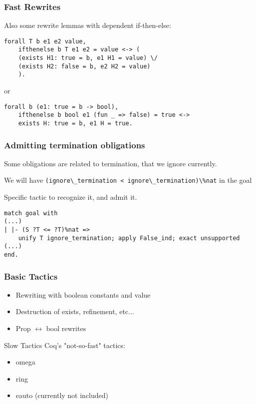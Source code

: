 \documentclass{beamer}
\newcommand{\coqInline}[1]{\lstinline[style=myCoqStyle]|#1|}
\begin{document}
\begin{frame}[fragile]
	\frametitle{Fast Rewrites}
	
	
	Also some rewrite lemmas with dependent if-then-else:
\begin{lstlisting}[style=myCoqstyle]
 forall T b e1 e2 value,
	ifthenelse b T e1 e2 = value <-> (
	(exists H1: true = b, e1 H1 = value) \/
	(exists H2: false = b, e2 H2 = value)
	).
\end{lstlisting}
	
	or
	
\begin{lstlisting}[style=myCoqstyle]
forall b (e1: true = b -> bool),
	ifthenelse b bool e1 (fun _ => false) = true <->
	exists H: true = b, e1 H = true.
\end{lstlisting}
	
\end{frame}

\begin{frame}[fragile]
	\frametitle{Admitting termination obligations}
	
	Some obligations are related to termination, that we ignore currently.
	
	We will have \coqInline{(ignore\_termination < ignore\_termination)\%nat} in the goal
	
	Specific tactic to recognize it, and admit it.
	
	\begin{lstlisting}[style=myCoqstyle]
match goal with
(...)
| |- (S ?T <= ?T)%nat =>
	unify T ignore_termination; apply False_ind; exact unsupported
(...)
end.
	\end{lstlisting}
	
\end{frame}


\begin{frame}
	\frametitle{Basic Tactics}
	\begin{itemize}
		\item Rewriting with boolean constants and value
		\item Destruction of exists, refinement, etc...
		\item Prop $\leftrightarrow$ bool rewrites
	\end{itemize}
\end{frame}


\begin{frame}{Slow Tactics}
	Coq's "not-so-fast" tactics:
	\begin{itemize}
		\item omega
		\item ring
		\item eauto (currently not included)
	\end{itemize}
\end{frame}
\end{document}
